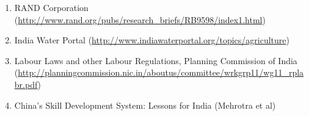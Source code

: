 \documentclass[a4paper, 10pt]{article}
\begin{document}
\begin{enumerate}
\item RAND Corporation (\url{http://www.rand.org/pubs/research_briefs/RB9598/index1.html})

\item India Water Portal (\url{http://www.indiawaterportal.org/topics/agriculture})

\item Labour Laws and other Labour Regulations, Planning Commission of India (\url{http://planningcommission.nic.in/aboutus/committee/wrkgrp11/wg11_rplabr.pdf})

\item China's Skill Development System: Lessons for India (Mehrotra et al)

\end{enumerate}
\end{document}

